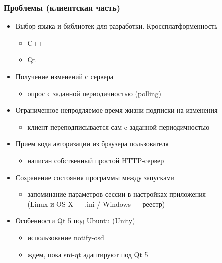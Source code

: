 \documentclass[10pt,pdf,hyperref={unicode}]{beamer}
\begin{document}
    \begin{frame}\frametitle{Проблемы (клиентская часть)}
        \begin{itemize}%
            \item Выбор языка и библиотек для разработки. Кроссплатформенность
            \pause
            \begin{itemize}
                \item C++
                \item Qt
            \end{itemize}
            \pause
            \item Получение изменений с сервера
            \pause
            \begin{itemize}
                \item опрос с заданной периодичностью (polling)
            \end{itemize}
            \pause
            \item Ограниченное непродляемое время жизни подписки на изменения
            \pause
            \begin{itemize}
                \item клиент переподписывается сам c заданной периодичностью
            \end{itemize}
            \pause
            \item Прием кода авторизации из браузера пользователя
            \pause
            \begin{itemize}
                \item написан собственный простой HTTP-сервер
            \end{itemize}
            \pause
            \item Сохранение состояния программы между запусками
            \pause
            \begin{itemize}
                \item запоминание параметров сессии в настройках приложения \\
                (Linux и OS X --- .ini / Windows --- реестр)
            \end{itemize}
            \pause
            \item Особенности Qt 5 под Ubuntu (Unity)
            \begin{itemize}
                \item использование notify-osd
                \item ждем, пока sni-qt адаптируют под Qt 5
            \end{itemize}
        \end{itemize}
    \end{frame}
    
\end{document}
